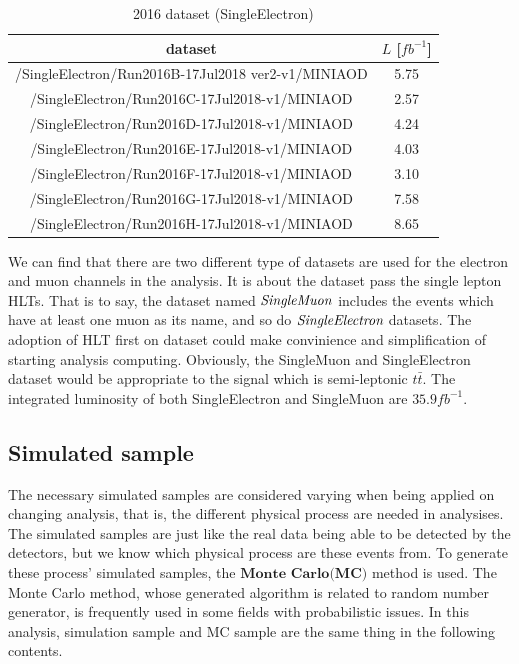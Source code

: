 		\begin{center}
		\setlength{\tabcolsep}{12pt}
		\begin{longtable}{ | c | c | }
		\caption{2016 dataset (SingleElectron)} \\
		\hline
		dataset & $L$ [$fb^{-1}$]\\
		\hline
		/SingleElectron/Run2016B-17Jul2018 ver2-v1/MINIAOD & 5.75 \\
		/SingleElectron/Run2016C-17Jul2018-v1/MINIAOD & 2.57 \\
		/SingleElectron/Run2016D-17Jul2018-v1/MINIAOD & 4.24 \\
		/SingleElectron/Run2016E-17Jul2018-v1/MINIAOD & 4.03 \\
		/SingleElectron/Run2016F-17Jul2018-v1/MINIAOD & 3.10 \\
		/SingleElectron/Run2016G-17Jul2018-v1/MINIAOD & 7.58 \\
		/SingleElectron/Run2016H-17Jul2018-v1/MINIAOD & 8.65 \\
		\hline
		\end{longtable}
		\label{DataAndMC:tb:dataset_el}
		\end{center}

		We can find that there are two different type of datasets are used for the electron and muon channels in the analysis. It is about the dataset pass the single lepton HLTs. That is to say, the dataset named $\emph{SingleMuon}$ includes the events which have at least one muon as its name, and so do $\emph{SingleElectron}$ datasets. The adoption of HLT first on dataset could make convinience and simplification of starting analysis computing. Obviously, the SingleMuon and SingleElectron dataset would be appropriate to the signal which is semi-leptonic $t\bar{t}$. The integrated luminosity of both SingleElectron and SingleMuon are $35.9 fb^{-1}$.

	\subsection{Simulated sample}
	\label{ssec:DataAndMC_MC}

		The necessary simulated samples are considered varying when being applied on changing analysis, that is, the different physical process are needed in analysises. The simulated samples are just like the real data being able to be detected by the detectors, but we know which physical process are these events from. To generate these process' simulated samples, the $\textbf{Monte Carlo(MC)}$ method is used. The Monte Carlo method, whose generated algorithm is related to random number generator, is frequently used in some fields with probabilistic issues. In this analysis, simulation sample and MC sample are the same thing in the following contents.

